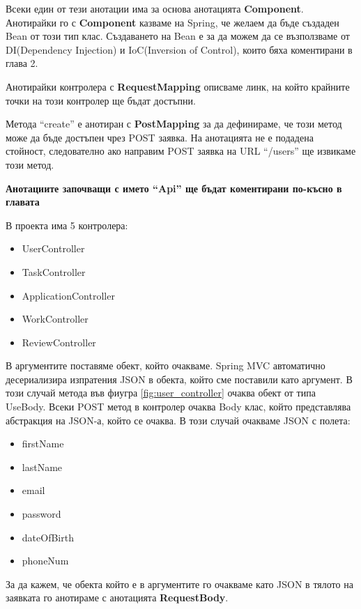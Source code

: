         Всеки един от тези анотации има за основа анотацията \textbf{Component}. Анотирайки го с \textbf{Component} казваме на Spring, че желаем да бъде създаден Bean от този тип клас. Създаването на Bean е за да можем да се възползваме от DI(Dependency Injection) и IoC(Inversion of Control), които бяха коментирани в глава 2.
        
        Анотирайки контролера с \textbf{RequestMapping} описваме линк, на който крайните точки на този контролер ще бъдат достъпни.
        
         Метода ``create'' е анотиран с \textbf{PostMapping} за да дефинираме, че този метод може да бъде достъпен чрез POST заявка. На анотацията не е подадена стойност, следователно ако направим POST заявка на URL ``/users'' ще извикаме този метод. 
        
        \textbf{Анотациите започващи с името ``Api'' ще бъдат коментирани по-късно в главата}
        
        В проекта има 5 контролера:
        \begin{itemize}
            \item UserController
            \item TaskController
            \item ApplicationController
            \item WorkController
            \item ReviewController
        \end{itemize}
        
        В аргументите поставяме обект, който очакваме. Spring MVC автоматично десериализира изпратения JSON в обекта, който сме поставили като аргумент. В този случай метода във фиугра \ref{fig:user_controller} очаква обект от типа UseBody. Всеки POST метод в контролер очаква Body клас, който представлява абстракция на JSON-а, който се очаква. В този случай очакваме JSON с полета:
        \begin{itemize}
            \item firstName
            \item lastName
            \item email
            \item password
            \item dateOfBirth
            \item phoneNum
        \end{itemize}
        
        За да кажем, че обекта който е в аргументите го очакваме като JSON в тялото на заявката го анотираме с анотацията \textbf{RequestBody}.
        
